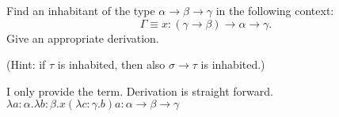 \begin{problem}{2.14}
    Find an inhabitant of the type $\alpha \rightarrow \beta \rightarrow \gamma$ in the following context: 
    $$\Gamma \equiv x : (\gamma \rightarrow \beta) \rightarrow \alpha \rightarrow \gamma.$$
    Give an appropriate derivation.
    
    (Hint: if $\tau$ is inhabited, then also $\sigma \rightarrow \tau$ is inhabited.)
\end{problem}

\begin{solution}
    I only provide the term. Derivation is straight forward. $ \lambda a:\alpha . \lambda b:\beta .x(\lambda c:\gamma . b)a : \alpha \to \beta \to \gamma $
\end{solution}